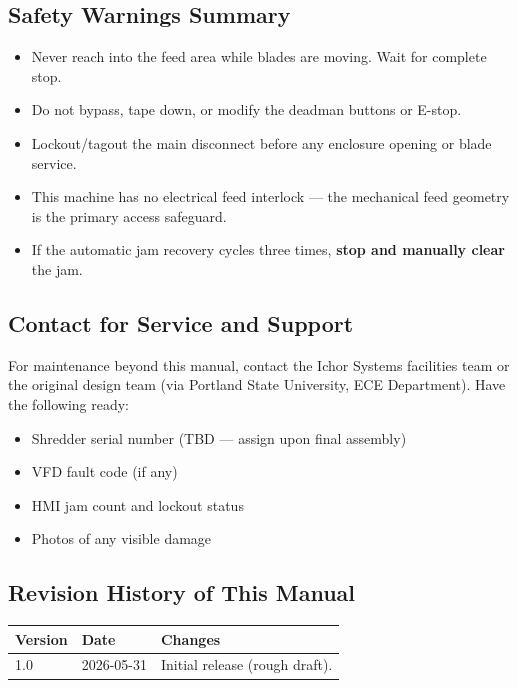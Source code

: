 \documentclass[hidelinks,12pt]{article}
\begin{document}
\subsection{Safety Warnings Summary}
\begin{tcolorbox}[colback=red!5!white, colframe=red!70!black, title=\textbf{⚠ CRITICAL SAFETY WARNINGS}]
\begin{itemize}
    \item Never reach into the feed area while blades are moving. Wait for complete stop.
    \item Do not bypass, tape down, or modify the deadman buttons or E-stop.
    \item Lockout/tagout the main disconnect before any enclosure opening or blade service.
    \item This machine has no electrical feed interlock — the mechanical feed geometry is the primary access safeguard.
    \item If the automatic jam recovery cycles three times, \textbf{stop and manually clear} the jam.
\end{itemize}
\end{tcolorbox}

\subsection{Contact for Service and Support}
For maintenance beyond this manual, contact the Ichor Systems facilities team or the original design team (via Portland State University, ECE Department). Have the following ready:
\begin{itemize}
    \item Shredder serial number (TBD — assign upon final assembly)
    \item VFD fault code (if any)
    \item HMI jam count and lockout status
    \item Photos of any visible damage
\end{itemize}

\subsection{Revision History of This Manual}
\begin{table}[H]
\centering
\begin{tabularx}{0.7\textwidth}{|l|l|X|}
\hline
\rowcolor{PSUgreen!12}\textbf{Version} & \textbf{Date} & \textbf{Changes} \\
\hline
1.0 & 2026-05-31 & Initial release (rough draft). \\
\hline
\end{tabularx}
\end{table}
\end{document}
